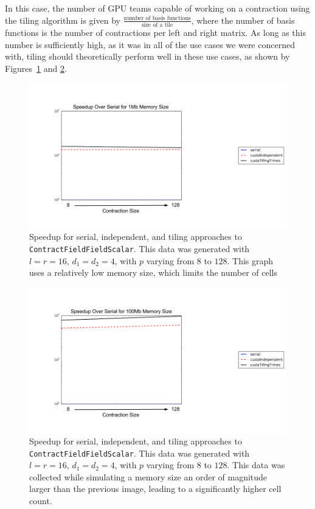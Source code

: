 In this case, the number of GPU teams
capable of working on a contraction using the tiling algorithm is given by
$\frac{\text{number of basis functions}}{\text{size of a tile}}$, where the number of basis functions
is the number of contractions per left and right matrix. As long as this number
is sufficiently high, as it was in all of the use cases we were concerned with, 
tiling should theoretically perform well in these use cases, as shown by
Figures~\ref{fig:multiDTiling1} and \ref{fig:multiDTiling2}.

\begin{figure}[H]
    \centering
    \includegraphics[width=5in]{CFFTTiling1}
    \caption[\texttt{ContractFieldFieldScalar} tiling (small
    memory)]{Speedup for serial, independent, and tiling approaches to
        \texttt{ContractFieldFieldScalar}.  This data was generated with
        $l=r=16$, $d_1=d_2=4$, with $p$
varying from $8$ to $128$. This graph uses a relatively low memory size, which
limits the number of cells}
\label{fig:multiDTiling1}
\end{figure}

\begin{figure}[H]
    \centering
\includegraphics[width=5in]{CFFTTiling2}
\caption[\texttt{ContractFieldFieldScalar} tiling (large
memory)]{Speedup for serial, independent, and tiling approaches to
    \texttt{ContractFieldFieldScalar}. This data was generated with
    $l=r=16$, $d_1=d_2=4$, with $p$ varying from $8$ to $128$. This
data was collected while simulating a memory size an order of magnitude larger
than the previous image, leading to a significantly higher cell count. }
\label{fig:multiDTiling2}
\end{figure}

